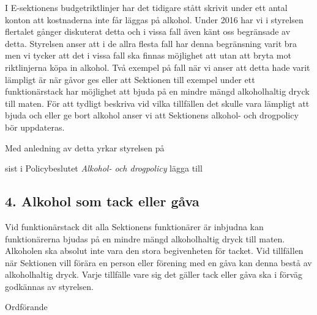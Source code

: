 \documentclass[../_main/handlingar.tex]{subfiles}
\begin{document}

I E-sektionens budgetriktlinjer har det tidigare stått skrivit under ett antal konton att kostnaderna inte får läggas på alkohol. Under 2016 har vi i styrelsen flertalet gånger diskuterat detta och i vissa fall även känt oss begränsade av detta. Styrelsen anser att i de allra flesta fall har denna begränsning varit bra men vi tycker att det i vissa fall ska finnas möjlighet att utan att bryta mot riktlinjerna köpa in alkohol. Två exempel på fall när vi anser att detta hade varit lämpligt är när gåvor ges eller att Sektionen till exempel under ett funktionärstack har möjlighet att bjuda på en mindre mängd alkoholhaltig dryck till maten. För att tydligt beskriva vid vilka tillfällen det skulle vara lämpligt att bjuda och eller ge bort alkohol anser vi att Sektionens alkohol- och drogpolicy bör uppdateras.

Med anledning av detta yrkar styrelsen på

\begin{attsatser}
    \att sist i Policybeslutet \emph{Alkohol- och drogpolicy} lägga till\par
    \begin{itshape}
        \subsection*{4. Alkohol som tack eller gåva}
        Vid funktionärstack dit alla Sektionens funktionärer är inbjudna kan funktionärerna bjudas på en mindre mängd alkoholhaltig dryck till maten. Alkoholen ska absolut inte vara den stora begivenheten för tacket. Vid tillfällen när Sektionen vill förära en person eller förening med en gåva kan denna bestå av alkoholhaltig dryck. Varje tillfälle vare sig det gäller tack eller gåva ska i förväg godkännas av styrelsen.
    \end{itshape}
\end{attsatser}

\begin{signatures}{1}
    \ist
    \signature{\ordf}{Ordförande}
\end{signatures}
\end{document}

